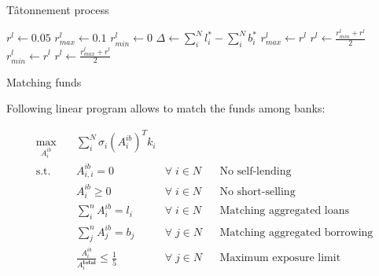 \documentclass{beamer}
\begin{document}
\begin{frame}{Tâtonnement process}
    
    \begin{algorithm}[H]
        \caption{tatonnement process}\label{alg:cap}
        \begin{algorithmic}
        \State $r^l \gets 0.05$
        \State $r^l_{max} \gets 0.1$
        \State $r^l_{min} \gets 0$
        \State $\Delta \gets \sum_{i}^{N} l_i^* - \sum_{i}^{N} b_i^*$
            \State $r^l_{max} \gets r^l$
            \State $r^l \gets \frac{r^l_{min} + r^l}{2}$
            \State $r^l_{min} \gets r^l$
            \State $r^l \gets \frac{r^l_{max} + r^l}{2}$
        \EndIf
        \EndWhile
        \end{algorithmic}
    \end{algorithm}

\end{frame}

\begin{frame}{Matching funds}

Following linear program allows to match the funds among banks:

\begin{equation}
    \begin{aligned}
    \max_{A^{ib}_i} \quad & \sum_{i}^{N} \sigma_i (A^{ib}_i)^T k_i\\
    \textrm{s.t.} \quad & A^{ib}_{i,i} = 0 & \forall \; i \in N && \text{No self-lending}\\
      & A^{ib}_i \geq 0 & \forall \; i \in N && \text{No short-selling}\\
      & \sum_i^n A^{ib}_i = l_i & \forall \; i \in N && \text{Matching aggregated loans}\\
      & \sum_j^n A^{ib}_j = b_j & \forall \; j \in N && \text{Matching aggregated borrowing}\\ 
      & \frac{A^{ib}_i}{A^{\textbf{total}}_i} \leq \frac{1}{5} & \forall \; j \in N && \text{Maximum exposure limit}\\ 
    \end{aligned}
  \end{equation}
    
\end{frame}
\end{document}
